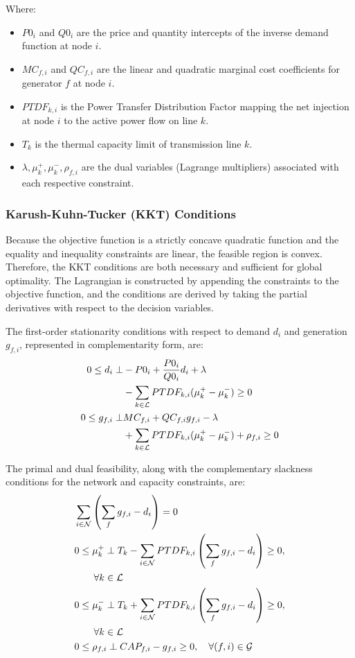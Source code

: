 \documentclass[lettersize,journal]{IEEEtran}
\begin{document}
Where:
\begin{itemize}
    \item $P0_i$ and $Q0_i$ are the price and quantity intercepts of the inverse demand function at node $i$.
    \item $MC_{f,i}$ and $QC_{f,i}$ are the linear and quadratic marginal cost coefficients for generator $f$ at node $i$.
    \item $PTDF_{k,i}$ is the Power Transfer Distribution Factor mapping the net injection at node $i$ to the active power flow on line $k$.
    \item $T_k$ is the thermal capacity limit of transmission line $k$.
    \item $\lambda, \mu_k^+, \mu_k^-, \rho_{f,i}$ are the dual variables (Lagrange multipliers) associated with each respective constraint.
\end{itemize}

\subsubsection{Karush-Kuhn-Tucker (KKT) Conditions}

Because the objective function is a strictly concave quadratic function and the equality and inequality constraints are linear, the feasible region is convex. Therefore, the KKT conditions are both necessary and sufficient for global optimality. The Lagrangian is constructed by appending the constraints to the objective function, and the conditions are derived by taking the partial derivatives with respect to the decision variables.

The first-order stationarity conditions with respect to demand $d_i$ and generation $g_{f,i}$, represented in complementarity form, are:
\begin{align}
    0 \leq d_i \perp & -P0_i + \frac{P0_i}{Q0_i} d_i + \lambda \notag \\
    & - \sum_{k \in \mathcal{L}} PTDF_{k,i} (\mu_k^+ - \mu_k^-) \geq 0 \\
    0 \leq g_{f,i} \perp & MC_{f,i} + QC_{f,i} g_{f,i} - \lambda \notag \\
    & + \sum_{k \in \mathcal{L}} PTDF_{k,i} (\mu_k^+ - \mu_k^-) + \rho_{f,i} \geq 0
\end{align}

The primal and dual feasibility, along with the complementary slackness conditions for the network and capacity constraints, are:
\begin{align}
    & \sum_{i \in \mathcal{N}} \left( \sum_f g_{f,i} - d_i \right) = 0 \\
    & 0 \leq \mu_k^+ \perp T_k - \sum_{i \in \mathcal{N}} PTDF_{k,i} \left( \sum_f g_{f,i} - d_i \right) \geq 0, \notag \\
    & \qquad \forall k \in \mathcal{L} \\
    & 0 \leq \mu_k^- \perp T_k + \sum_{i \in \mathcal{N}} PTDF_{k,i} \left( \sum_f g_{f,i} - d_i \right) \geq 0, \notag \\
    & \qquad \forall k \in \mathcal{L} \\
    & 0 \leq \rho_{f,i} \perp CAP_{f,i} - g_{f,i} \geq 0, \quad \forall (f,i) \in \mathcal{G}
\end{align}
\end{document}
